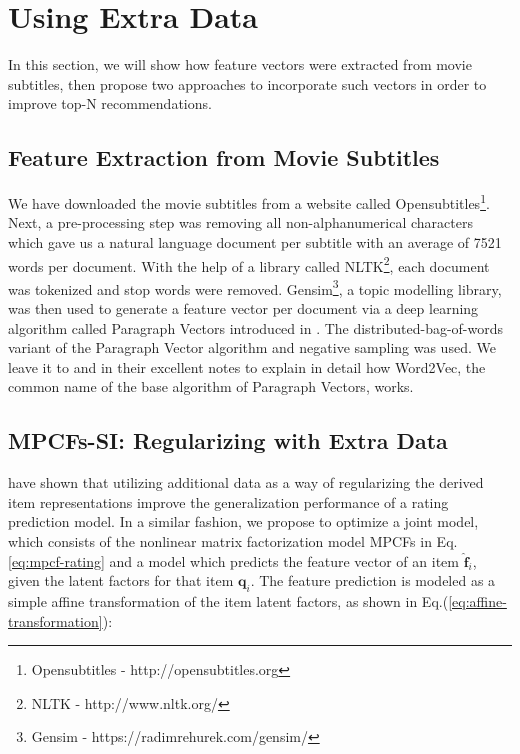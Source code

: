  

\section{Using Extra Data}
\label{st:using-extra-data}
In this section, we will show how feature vectors were extracted from movie subtitles, then propose two approaches to incorporate such vectors in order to improve top-N recommendations.

\subsection{Feature Extraction from Movie Subtitles}
\label{sst:feature-extraction}
We have downloaded the movie subtitles from a website called Opensubtitles\footnote{Opensubtitles - http://opensubtitles.org}.
Next, a pre-processing step was removing all non-alphanumerical characters which gave us a natural language document per subtitle with an average of 7521 words per document.
With the help of a library called NLTK\footnote{\label{fn:nltk}NLTK - http://www.nltk.org/}, each document was tokenized and stop words were removed.
Gensim\footnote{Gensim - https://radimrehurek.com/gensim/}, a topic modelling library, was then used to generate a feature vector per document via a deep learning algorithm called Paragraph Vectors introduced in \cite{Le2014a}.
The distributed-bag-of-words variant of the Paragraph Vector algorithm and negative sampling was used.
We leave it to \cite{Rong} and \cite{Goldberg2014} in their excellent notes to explain in detail how Word2Vec, the common name of the base algorithm of Paragraph Vectors, works.

\subsection{MPCFs-SI: Regularizing with Extra Data}
\label{sst:mpcfs-si}

\cite{Almahairi2015} have shown that utilizing additional data as a way of regularizing the derived item representations improve the generalization performance of a rating prediction model.
In a similar fashion, we propose to optimize a joint model, which consists of the nonlinear matrix factorization model MPCFs in Eq. \ref{eq:mpcf-rating} and a model which predicts the feature vector of an item $\mathbf{\hat{f}}_i$, given the latent factors for that item $\mathbf{q}_i$.
The feature prediction is modeled as a simple affine transformation of the item latent factors, as shown in Eq.(\ref{eq:affine-transformation}):

